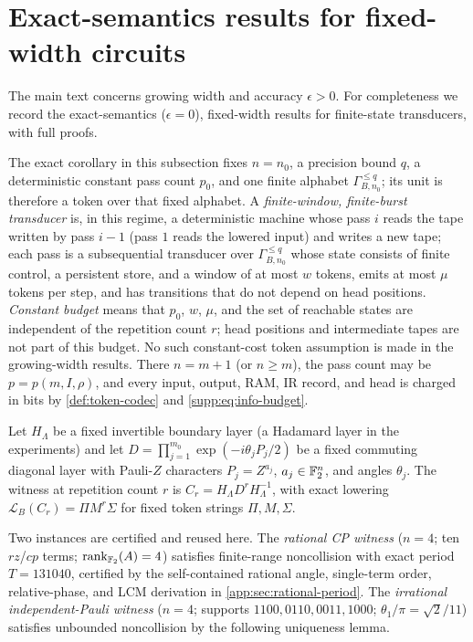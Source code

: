 \section{Exact-semantics results for fixed-width circuits}
\label{supp:exact}

The main text concerns growing width and accuracy $\epsilon>0$.  For
completeness we record the exact-semantics ($\epsilon=0$), fixed-width
results for finite-state transducers, with full proofs.

\begin{remark}
\label{rem:encoding-regimes}
The exact corollary in this subsection fixes $n=n_0$, a precision bound
$q$, a deterministic constant pass count $p_0$, and one finite alphabet
$\Gamma_{B,n_0}^{\leq q}$; its unit is therefore a token over that fixed
alphabet.  A \emph{finite-window, finite-burst transducer} is, in this
regime, a deterministic machine whose pass $i$ reads the tape written by
pass $i-1$ (pass $1$ reads the lowered input) and writes a new tape; each
pass is a subsequential transducer over $\Gamma_{B,n_0}^{\leq q}$ whose
state consists of finite control, a persistent store, and a window of at
most $w$ tokens, emits at most $\mu$ tokens per step, and has transitions
that do not depend on head positions.  \emph{Constant budget} means that
$p_0$, $w$, $\mu$, and the set of reachable states are independent of the
repetition count $r$; head positions and intermediate tapes are not part
of this budget.  No such constant-cost token assumption is made in the
growing-width results.  There $n=m+1$ (or $n\geq m$), the pass count may be
$p=p(m,I,\rho)$, and every input, output, RAM, IR record, and head is
charged in bits by \cref{def:token-codec} and \eqref{supp:eq:info-budget}.
\end{remark}

\begin{definition}
\label{def:witness-family}
Let $H_\Lambda$ be a fixed invertible boundary layer (a Hadamard layer in
the experiments) and let
$D = \prod_{j=1}^{m_0} \exp(-i\theta_j P_j/2)$
be a fixed commuting diagonal layer with Pauli-$Z$ characters
$P_j = Z^{a_j}$, $a_j \in \mathbb{F}_2^{n}$, and angles $\theta_j$. The witness
at repetition count $r$ is $C_r = H_\Lambda D^{r} H_\Lambda^{-1}$, with
exact lowering $\mathcal{L}_B(C_r) = \Pi M^r \Sigma$ for fixed token
strings $\Pi, M, \Sigma$.
\end{definition}

Two instances are certified and reused here. The
\emph{rational CP witness} ($n = 4$; ten $rz$/$cp$ terms;
$\operatorname{rank}_{\mathbb{F}_2}(A) = 4$) satisfies finite-range noncollision
with exact period $T = 131040$, certified by the self-contained rational
angle, single-term order, relative-phase, and LCM derivation in
\cref{app:sec:rational-period}. The
\emph{irrational independent-Pauli witness} ($n = 4$; supports
$1100, 0110, 0011, 1000$; $\theta_1/\pi = \sqrt{2}/11$) satisfies
unbounded noncollision by the following uniqueness lemma.

